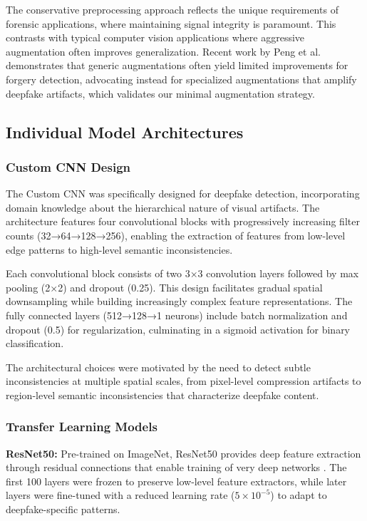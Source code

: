 \documentclass[conference]{IEEEtran}
\begin{document}
The conservative preprocessing approach reflects the unique requirements of forensic applications, where maintaining signal integrity is paramount. This contrasts with typical computer vision applications where aggressive augmentation often improves generalization. Recent work by Peng et al. \cite{peng2024artifacts} demonstrates that generic augmentations often yield limited improvements for forgery detection, advocating instead for specialized augmentations that amplify deepfake artifacts, which validates our minimal augmentation strategy.

\subsection{Individual Model Architectures}

\subsubsection{Custom CNN Design}

The Custom CNN was specifically designed for deepfake detection, incorporating domain knowledge about the hierarchical nature of visual artifacts. The architecture features four convolutional blocks with progressively increasing filter counts (32→64→128→256), enabling the extraction of features from low-level edge patterns to high-level semantic inconsistencies.

Each convolutional block consists of two 3×3 convolution layers followed by max pooling (2×2) and dropout (0.25). This design facilitates gradual spatial downsampling while building increasingly complex feature representations. The fully connected layers (512→128→1 neurons) include batch normalization and dropout (0.5) for regularization, culminating in a sigmoid activation for binary classification.

The architectural choices were motivated by the need to detect subtle inconsistencies at multiple spatial scales, from pixel-level compression artifacts to region-level semantic inconsistencies that characterize deepfake content.

\subsubsection{Transfer Learning Models}

\textbf{ResNet50:} Pre-trained on ImageNet, ResNet50 provides deep feature extraction through residual connections that enable training of very deep networks \cite{he2016deep}. The first 100 layers were frozen to preserve low-level feature extractors, while later layers were fine-tuned with a reduced learning rate ($5 \times 10^{-5}$) to adapt to deepfake-specific patterns.
\end{document}
